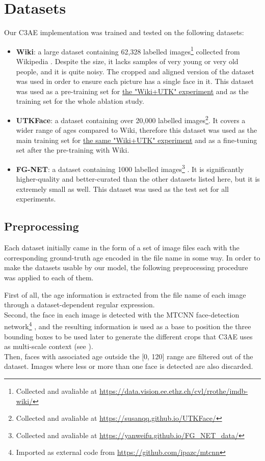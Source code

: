 
\chapter{Datasets}

Our C3AE implementation was trained and tested on the following datasets:

\begin{itemize}
  \item \textbf{Wiki}:
    a large dataset containing 62,328 labelled
    images\footnote{Collected and avaliable at \url{https://data.vision.ee.ethz.ch/cvl/rrothe/imdb-wiki/}}
    collected from Wikipedia \cite{wiki}.
    Despite the size, it lacks samples of very young
    or very old people, and it is quite noisy.
    The cropped and aligned version of the dataset
    was used in order to ensure each picture has a single face in it.
    This dataset was used as a pre-training set for
    \hyperref[subsec:wikiutk]{the "Wiki+UTK" experiment}
    and as the training set for the whole ablation study.
  \item \textbf{UTKFace}:
    a dataset containing over 20,000 labelled
    images\footnote{Collected and avaliable at \url{https://susanqq.github.io/UTKFace/}}.
    It covers a wider range of ages compared to Wiki,
    therefore this dataset was used as the main training set
    for \hyperref[subsec:wikiutk]{the same "Wiki+UTK" experiment} 
    and as a fine-tuning set after the pre-training with Wiki.
  \item \textbf{FG-NET}:
    a dataset containing 1000 labelled
    images\footnote{Collected and avaliable at \url{https://yanweifu.github.io/FG_NET_data/}}
    \cite{fgnet}.
    It is significantly higher-quality and better-curated than the other
    datasets listed here, but it is extremely small as well.
    This dataset was used as the test set for all experiments.
\end{itemize}

\section{Preprocessing}
Each dataset initially came in the form of a set of image files each with the
corresponding ground-truth age encoded in the file name in some way.
In order to make the datasets usable by our model, the following
preprocessing procedure was applied to each of them.

First of all, the age information is extracted from the file name of each
image through a dataset-dependent regular expression. \\
Second, the face in each image is detected with the MTCNN face-detection
network\footnote{Imported as external code from \url{https://github.com/ipazc/mtcnn}}
\cite{mtcnn}, and the resulting information is used as a base to position
the three bounding boxes to be used later to generate the different crops
that C3AE uses as multi-scale context (see ). \\
Then, faces with associated age outside the [0, 120] range are filtered
out of the dataset. Images where less or more than one face is detected
are also discarded.


